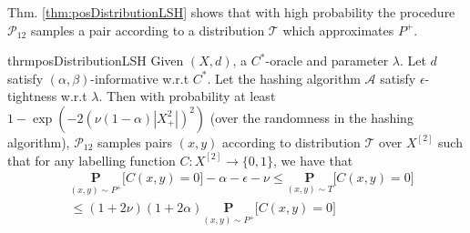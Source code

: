 \documentclass[12pt]{article}
\newcommand{\mb}{\mathbf}
\newcommand{\mc}{\mathcal}
\begin{document}
Thm. \ref{thm:posDistributionLSH} shows that with high probability the procedure $\mc P_{12}$ samples a pair according to a distribution $\mc T$  which approximates $P^+$. 
\begin{restatable}{thrm}{posDistributionLSH}
\label{thm:posDistributionLSH}
Given $(X, d)$, a $C^*$-oracle and parameter $\lambda$. Let $d$ satisfy $(\alpha, \beta)$-informative  w.r.t $C^*$. Let the hashing algorithm $\mc A$ satisfy $\epsilon$-tightness w.r.t $\lambda$. Then with probability at least $1-\exp(-2(\nu(1-\alpha)|X^2_+|)^2)$ (over the randomness in the hashing algorithm), $\mc P_{12}$ samples pairs $(x, y)$  according to distribution $\mc T$ over $X^{[2]}$ such that for any labelling function $C : X^{[2]} \rightarrow \{0, 1\}$, we have that 
\begin{align*}
  &\underset{(x, y) \sim P^+}{\mb P} \big[ C(x, y) = 0 ] -\alpha -\epsilon -\nu \le \underset{(x, y) \sim T}{\mb P} \big[ C(x, y) = 0 ] \\
  &\le  (1 + 2\nu)(1+2\alpha) \underset{(x, y) \sim P^+}{\mb P} \big[ C(x, y) = 0 ]
\end{align*} 
\end{restatable}
\end{document}
